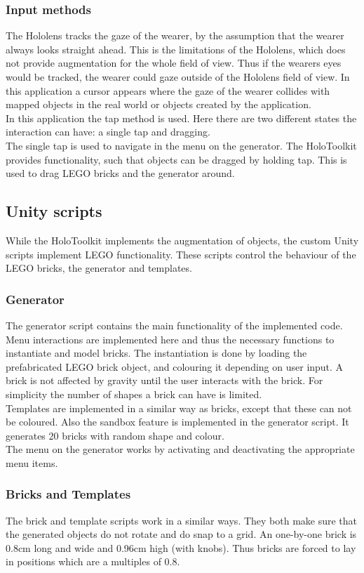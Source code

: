 \subsubsection{Input methods}
The Hololens tracks the gaze of the wearer, by the assumption that the wearer always looks straight ahead. This is the limitations of the Hololens, which does not provide augmentation for the whole field of view. Thus if the wearers eyes would be tracked, the wearer could gaze outside of the Hololens field of view. In this application a cursor appears where the gaze of the wearer collides with mapped objects in the real world or objects created by the application.\\ 
In this application the tap method is used. Here there are two different states the interaction can have: a single tap and dragging. \\
The single tap is used to navigate in the menu on the generator. The HoloToolkit provides functionality, such that objects can be dragged by holding tap. This is used to drag LEGO bricks and the generator around.

\subsection{Unity scripts}
While the HoloToolkit implements the augmentation of objects, the custom Unity scripts implement LEGO functionality. These scripts control the behaviour of the LEGO bricks, the generator and templates. 

\subsubsection{Generator}
The generator script contains the main functionality of the implemented code. Menu interactions are implemented here and thus the necessary functions to instantiate and model bricks. The instantiation is done by loading the prefabricated LEGO brick object, and colouring it depending on user input. A brick is not affected by gravity until the user interacts with the brick. For simplicity the number of shapes a brick can have is limited. \\
Templates are implemented in a similar way as bricks, except that these can not be coloured. Also the sandbox feature is implemented in the generator script. It generates 20 bricks with random shape and colour. \\
The menu on the generator works by activating and deactivating the appropriate menu items. 

\subsubsection{Bricks and Templates}
The brick and template scripts work in a similar ways. They both make sure that the generated objects do not rotate and do snap to a grid. An one-by-one brick is 0.8cm long and wide and 0.96cm high (with knobs). Thus bricks are forced to lay in positions which are a multiples of 0.8.